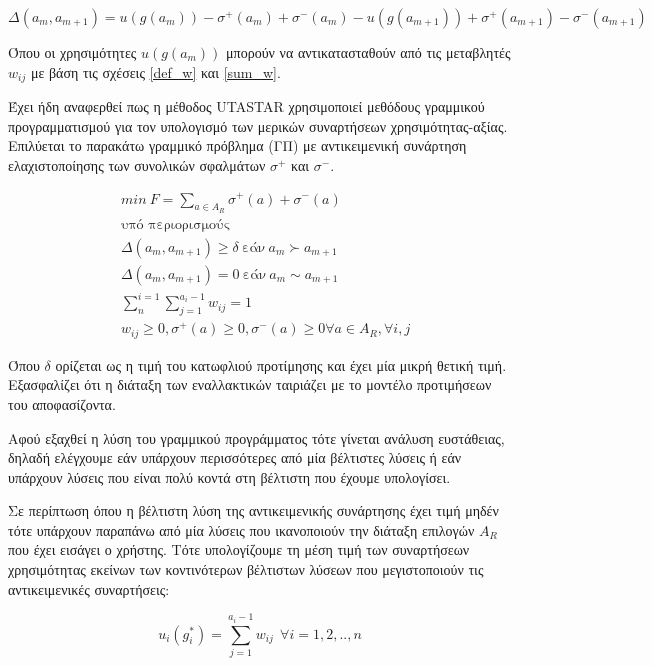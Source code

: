 \documentclass[11pt,a4paper,titlepage]{article}
\numberwithin{equation}{section}
\begin{document}
\begin{equation}\label{def_deltas}
	Δ(a_{m}, a_{m+1}) = u(g(a_{m})) - σ^{+}(a_{m}) + σ^{-}(a_{m}) - u(g(a_{m+1})) + σ^{+}(a_{m+1}) - σ^{-}(a_{m+1})
\end{equation}

Όπου οι χρησιμότητες $u(g(a_{m}))$ μπορούν να αντικατασταθούν από τις μεταβλητές $w_{ij}$ με βάση τις σχέσεις \ref{def_w} και \ref{sum_w}.
 
Έχει ήδη αναφερθεί πως η μέθοδος UTASTAR χρησιμοποιεί μεθόδους γραμμικού προγραμματισμού για τον υπολογισμό των μερικών συναρτήσεων χρησιμότητας-αξίας. Επιλύεται το παρακάτω γραμμικό πρόβλημα (ΓΠ) με αντικειμενική συνάρτηση ελαχιστοποίησης των συνολικών σφαλμάτων $σ^{+}$ και $σ^{-}$.

\begin{equation}\label{linear_program}
	\begin{aligned}
	&min~F = \sum_{a\in A_{R}} {σ^{+}(a) + σ^{-}(a)} \\
	&\text{υπό περιορισμούς}\\
	&Δ(a_{m},a_{m+1}) \geq δ ~\text{εάν}~ a_{m}\succ a_{m+1}\\
	&Δ(a_{m},a_{m+1}) = 0 ~\text{εάν}~ a_{m}\sim a_{m+1}\\
	&\sum_{n}^{i=1}\sum_{j=1}^{a_{i}-1} w_{ij} = 1\\
	& w_{ij} \geq 0, σ^{+}(a) \geq 0, σ^{-}(a) \geq 0 \forall a\in A_{R}, \forall i,j
	\end{aligned}
\end{equation}
 
\newpage

Όπου $δ$ ορίζεται ως η τιμή του κατωφλιού προτίμησης και έχει μία μικρή θετική τιμή. Εξασφαλίζει ότι η διάταξη των εναλλακτικών ταιριάζει με το μοντέλο προτιμήσεων του αποφασίζοντα.

Αφού εξαχθεί η λύση του γραμμικού προγράμματος τότε γίνεται ανάλυση ευστάθειας, δηλαδή ελέγχουμε εάν υπάρχουν περισσότερες από μία βέλτιστες λύσεις ή εάν υπάρχουν λύσεις που είναι πολύ κοντά στη βέλτιστη που έχουμε υπολογίσει.

Σε περίπτωση όπου η βέλτιστη λύση της αντικειμενικής συνάρτησης έχει τιμή μηδέν τότε υπάρχουν παραπάνω από μία λύσεις που ικανοποιούν την διάταξη επιλογών $A_{R}$ που έχει εισάγει ο χρήστης. Τότε υπολογίζουμε τη μέση τιμή των συναρτήσεων χρησιμότητας εκείνων των κοντινότερων βέλτιστων λύσεων που μεγιστοποιούν τις αντικειμενικές συναρτήσεις:

\begin{equation}\label{eq:sens-analysis-Obj-Fun}
	u_{i}(g_{i}^{*}) = \sum_{j=1}^{a_{i}-1} w_{ij}  ~~\forall i=1,2,..,n
\end{equation} 
\end{document}
